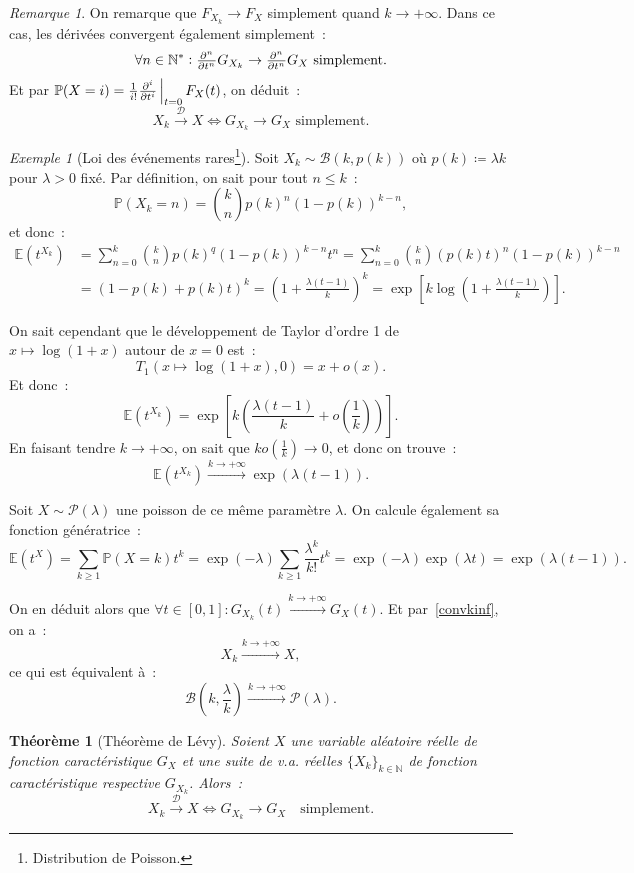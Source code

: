 \documentclass{article}
\newcommand{\E}{\mathbb E}
\newcommand{\N}{\mathbb N}
\renewcommand{\P}{\mathbb P}
\newcommand{\convl}{\stackrel{\mathcal D}\to}  %
\newcommand{\evipd}[3][i]{\pd[i] {}{#2}\sVert[2]_{#2=#3}}  %
\newtheorem{thm}{Théorème}[section]
\theoremstyle{definition}
\theoremstyle{remark}
\newtheorem*{rmq}{Remarque}
\newtheorem{ex}{Exemple}
\begin{document}
		\begin{rmq} On remarque que $F_{X_k} \to F_X$ simplement quand $k \to +\infty$. Dans ce cas, les dérivées convergent également simplement~:
		\[\forall n \in \N^* : \pd[n] {}tG_{X_k} \to \pd[n] {}tG_X \text{ simplement}.\]
		Et par $\P(X=i) = \frac 1{i!}\evipd t0F_X(t)$, on déduit~:
		\[X_k \convl X \iff G_{X_k} \to G_X \text{ simplement}.\]
		\end{rmq}

		\begin{ex}[Loi des événements rares\footnote{Distribution de Poisson.}] Soit $X_k \sim \mathcal B(k, p(k))$ où $p(k) \coloneqq \lambda k$ pour
		$\lambda > 0$ fixé. Par définition, on sait pour tout $n \leq k$~:
		\[\P(X_k = n) = \binom knp(k)^n(1-p(k))^{k-n},\]
		et donc~:
		\begin{align*}
			\E\left(t^{X_k}\right) &= \sum_{n=0}^k\binom knp(k)^q(1-p(k))^{k-n}t^n = \sum_{n=0}^k\binom kn\left(p(k)t\right)^n\left(1-p(k)\right)^{k-n} \\
			&= (1-p(k) + p(k)t)^k = \left(1 + \frac {\lambda(t-1)}k\right)^k = \exp\left[k\log\left(1 + \frac {\lambda(t-1)}k\right)\right].
		\end{align*}

		On sait cependant que le développement de Taylor d'ordre 1 de $x \mapsto \log(1+x)$ autour de $x=0$ est~:
		\[T_1(x \mapsto \log(1+x), 0) = x + o(x).\]
		Et donc~:
		\[\E\left(t^{X_k}\right) = \exp\left[k\left(\frac {\lambda(t-1)}k + o\left(\frac 1k\right)\right)\right].\]
		En faisant tendre $k \to +\infty$, on sait que $k o\left(\frac 1k\right) \to 0$, et donc on trouve~:
		\[\E\left(t^{X_k}\right) \stackrel{k \to +\infty}\to\exp\left(\lambda(t-1)\right).\]

		Soit $X \sim \mathcal P(\lambda)$ une poisson de ce même paramètre $\lambda$. On calcule également sa fonction génératrice~:
		\[\E\left(t^X\right) = \sum_{k \geq 1}\P(X=k)t^k = \exp(-\lambda)\sum_{k \geq 1}\frac {\lambda^k}{k!}t^k = \exp(-\lambda)\exp(\lambda t)
		= \exp\left(\lambda(t-1)\right).\]

		On en déduit alors que $\forall t \in [0, 1] : G_{X_k}(t) \stackrel {k \to +\infty}\to G_X(t)$. Et par~\eqref{convkinf}, on a~:
		\[X_k \stackrel {k \to +\infty}\to X,\]
		ce qui est équivalent à~:
		\[\mathcal B\left(k, \frac \lambda k\right) \stackrel {k \to +\infty}\to \mathcal P(\lambda).\]
		\end{ex}

		\begin{thm}[Théorème de Lévy] Soient $X$ une variable aléatoire réelle de fonction caractéristique $G_X$ et une suite de v.a. réelles $\{X_k\}_{k \in \N}$
		de fonction caractéristique respective $G_{X_k}$. Alors~:
		\[X_k \convl X \iff G_{X_k} \to G_X\quad\text{simplement}.\]
		\end{thm}
\end{document}
